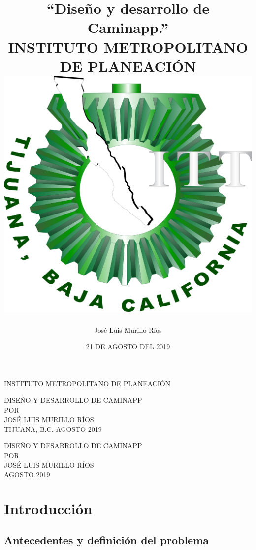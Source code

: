 \documentclass[12pt]{report}
\title{
   {“Diseño y desarrollo de Caminapp.”}\\
   {\large INSTITUTO METROPOLITANO DE PLANEACIÓN}\\
   {\includegraphics{escudo1.png}}
}
\author{José Luis Murillo Ríos}
\date{21 DE AGOSTO DEL 2019}
\begin{document}
\setcounter{page}{1}
\thispagestyle{empty}
\begin{center}
   INSTITUTO METROPOLITANO DE PLANEACIÓN\\[0.75cm]
\end{center}
\begin{figure}[h]
\begin{center}

\vspace{0cm}
\end{center}
\end{figure}
\vspace{1cm}
\begin{center}
DISEÑO Y DESARROLLO DE CAMINAPP\\[4mm]
POR\\[4mm]
JOSÉ LUIS MURILLO RÍOS\\[1cm]
\vfill
TIJUANA, B.C. \hfill AGOSTO 2019
\end{center}

\newpage
\thispagestyle{empty}
\begin{center}
DISEÑO Y DESARROLLO DE CAMINAPP\\[1.3cm]
POR\\[0.8cm]
JOSÉ LUIS MURILLO RÍOS\\[0.8cm]
\small AGOSTO 2019\\[0.7cm]
\end{center}

\newpage

 
\newpage
\tableofcontents

\newpage
\listoftables
{} %
\listoffigures
{}
\lstlistoflistings

\chapter{Introducción}


\section{Antecedentes y definición del problema}

\end{document}
